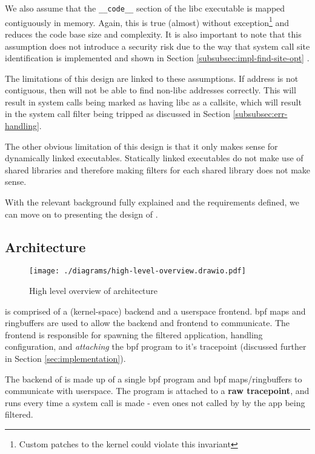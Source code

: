 We also assume that the \texttt{\_\_code\_\_} section of the \ac{libc}
executable is mapped contiguously in memory. Again, this is
true (almost) without exception\footnote{Custom patches to the kernel could
violate this invariant} and reduces the code base size and complexity.
It is also important to note that this assumption does not introduce a security
risk due to the way that system call site identification is implemented and shown in
Section \ref{subsubsec:impl-find-site-opt} \cite{glibc-dl-map-segments-h}.

The limitations of this design are linked to these assumptions. If 
address is not contiguous, then \af will not be able to find non-\ac{libc}
addresses correctly. This will result in system calls being marked as having 
\ac{libc} as a callsite, which will result in the system call filter being
tripped as discussed in Section \ref{subsubsec:err-handling}. 

The other obvious limitation of this design is that it only makes sense for
dynamically linked executables. Statically linked executables do not make use of
shared libraries and therefore making filters for each shared library does not
make sense.

With the relevant background fully explained and the requirements defined, we
can move on to presenting the design of \afss.~ 

\subsection{Architecture} \label{subsec:arch}

\begin{figure}[ht]
    \centering
    \texttt{[image: ./diagrams/high-level-overview.drawio.pdf]} 
    \caption{High level overview of \afg architecture}
    \label{fig:arch-overview}
\end{figure}

\af is comprised of a (kernel-space) backend and a userspace frontend.
\ac{bpf} maps and ringbuffers are used to allow the backend and frontend to
communicate. The frontend is responsible for spawning the filtered application,
handling configuration, and \textit{attaching} the \ac{bpf} program to it's
tracepoint (discussed further in Section \ref{sec:implementation}).

The backend of \af is made up of a single \ac{bpf} program and \ac{bpf}
maps/ringbuffers to communicate with userspace.
The program is attached to a \textbf{raw tracepoint}, and runs every time
a system call is made - even ones not called by by the app being filtered.

